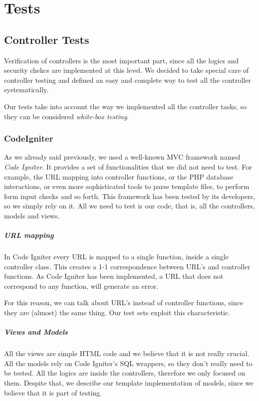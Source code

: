 \chapter{Tests}

\section{Controller Tests}
\label{subsec:controllertests}

Verification of controllers is the most important part, since all the logics and security chekcs are implemented at this level. We decided to take special care of controller testing and defined an easy and complete way to test all the controller systematically.

Our tests take into account the way we implemented all the controller tasks, so they can be considered \emph{white-box testing}. 

\subsection{CodeIgniter}
As we already said previously, we used a well-known MVC framework named \emph{Code Igniter}. It provides a set of functionalities that we did not need to test. For example, the URL mapping into controller functions, or the PHP database interactions, or even more sophisticated tools to parse template files, to perform form input checks and so forth. This framework has been tested by its developers, so we simply rely on it. All we need to test is our code, that is, all the controllers, models and views.

\paragraph{URL mapping}
In Code Igniter every URL is mapped to a single function, inside a single controller class. This creates a 1-1 correspondence between URL's and controller functions. As Code Igniter has been implemented, a URL that does not correspond to any function, will generate an error.

For this reason, we can talk about URL's instead of controller functions, since they are (almost) the same thing. Our test sets exploit this characteristic.

\paragraph{Views and Models}
All the views are simple HTML code and we believe that it is not really crucial. All the models rely on Code Igniter's SQL wrappers, so they don't really need to be tested. All the logics are inside the controllers, therefore we only focused on them. Despite that, we describe our template implementation of models, since we believe that it is part of testing.

